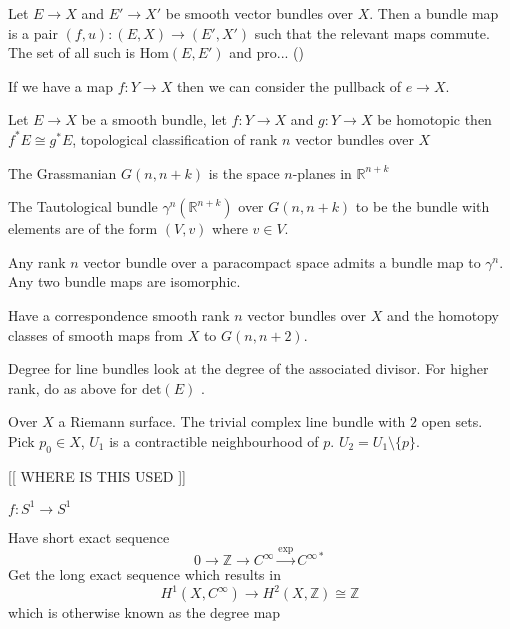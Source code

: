 \begin{definition}
    Let $E \rightarrow X $ and $ E' \rightarrow  X' $ be smooth vector bundles over $ X$. 
    Then a bundle map is a pair $(f,u) : (E,X) \rightarrow  ( E', X') $ such that the relevant maps commute. 
    The set of all such is $\mathrm{Hom}(E, E') $ and pro... () 
\end{definition}

If we have a map $ f: Y \rightarrow X $ then we can consider the pullback of $ e \rightarrow X $. 


\begin{proposition}
    Let $E \rightarrow X $ be a smooth bundle, let $ f: Y \rightarrow  X $ 
    and $ g: Y \rightarrow X $ be homotopic then $ f^* E \cong g^* E $, 
    topological classification of rank $n$ vector bundles over $ X $ 
\end{proposition}

\begin{definition}
    The Grassmanian $G(n, n+k) $ is the space $n$-planes in $ \mathbb{R} ^{n+k} $
\end{definition}

\begin{definition}
    The Tautological bundle $ \gamma^n ( \mathbb{R} ^{n+k} ) $ over $ G(n, n+k) $
     to be the bundle with elements are of the form $ (V, v) $ where $ v \in V$. 
\end{definition}

\begin{theorem}
    Any rank $n$ vector bundle over a paracompact space admits a bundle map to $ \gamma^n $. 
    Any two bundle maps are isomorphic. 
\end{theorem}

Have a correspondence smooth rank $n$ vector bundles over $ X $ 
and the homotopy classes of smooth maps from $ X $ to $ G(n,n+2) $. 

Degree for line bundles look at the degree of the associated divisor. 
For higher rank, do as above for $ \mathrm{det} ( E) $ . 


Over $ X$ a Riemann surface. 
The trivial complex line bundle with $ 2$ open sets. 
Pick  $p_0 \in X $, $U_1 $ is a contractible neighbourhood of $p$.
$ U_2  = U_1 \setminus \{p\} $. 

[[ WHERE IS THIS USED ]] 

$f : S^1 \rightarrow S^1 $ 

Have short exact sequence 
\begin{equation}
    0 \rightarrow  \mathbb{Z}  \rightarrow  C^\infty \xrightarrow{\mathrm{exp}} C^{\infty *}
\end{equation}
Get the long exact sequence which results in 
\begin{equation}
    H^1 ( X, C^\infty ) \rightarrow H^2( X, \mathbb{Z} ) \cong \mathbb{Z} 
\end{equation}
which is otherwise known as the degree map

